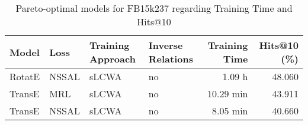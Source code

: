 \begin{table}[H]
\centering
\caption{Pareto-optimal models for FB15k237 regarding Training Time and Hits@10}
\label{tab:skyline_fb15k237_training_time}
\begin{tabular}{llllrr}
\toprule
  Model &   Loss & Training Approach & Inverse Relations & Training Time &  Hits@10 (\%) \\
\midrule
 RotatE &  NSSAL &             sLCWA &                no &        1.09 h &       48.060 \\
 TransE &    MRL &             sLCWA &                no &     10.29 min &       43.911 \\
 TransE &  NSSAL &             sLCWA &                no &      8.05 min &       40.660 \\
\bottomrule
\end{tabular}
\end{table}

